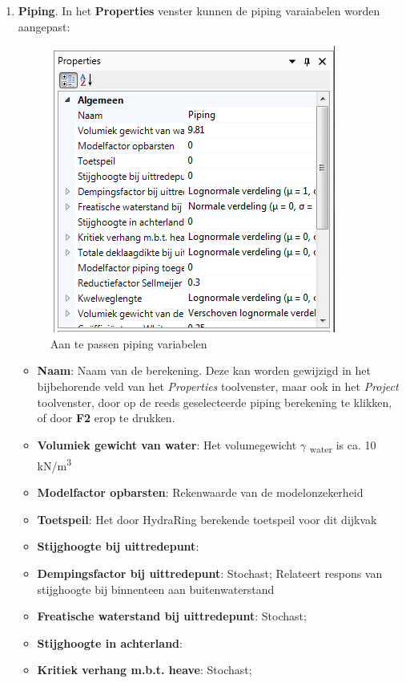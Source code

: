\begin{enumerate}
\item \textbf{Piping}. In het \textbf{Properties} venster kunnen de piping varaiabelen worden aangepast:
\begin{figure} [H]
	\centering
		\includegraphics{figures/chapter_piping/PipingProperties}
	\caption{Aan te passen piping variabelen}
	\label{fig:piping.PipingProperties}
\end{figure}
	\begin{itemize}
	\item \textbf{Naam}: Naam van de berekening. Deze kan worden gewijzigd in het bijbehorende veld van het \textit{Properties} toolvenster, maar ook in het \textit{Project} toolvenster, door op de reeds geselecteerde piping berekening te klikken, of door \textbf{F2} erop te drukken.
	\item \textbf{Volumiek gewicht van water}: Het volumegewicht  $\gamma$ \textsubscript{water}  is ca. 10 kN/m\textsuperscript{3}
	\item \textbf{Modelfactor opbarsten}: Rekenwaarde van de modelonzekerheid
	\item \textbf{Toetspeil}: Het door HydraRing berekende toetspeil voor dit dijkvak
	\item \textbf{Stijghoogte bij uittredepunt}: 
	\item \textbf{Dempingsfactor bij uittredepunt}: Stochast; Relateert respons van stijghoogte bij binnenteen aan buitenwaterstand
	\item \textbf{Freatische waterstand bij uittredepunt}: Stochast; 
	\item \textbf{Stijghoogte in achterland}: 
	\item \textbf{Kritiek verhang m.b.t. heave}: Stochast; 

\end{itemize}
\end{enumerate}

